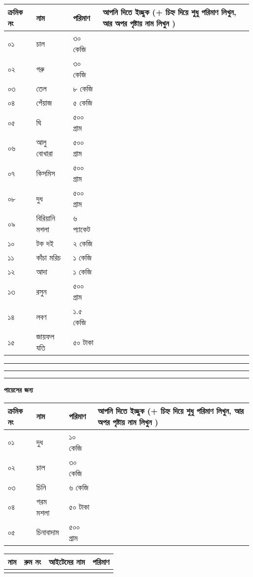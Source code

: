 \documentclass[12pt]{article}
\newcommand{\aline}{\\\hline \arabic{theyflines} &&&\rule{0cm}{0.8cm}}
\begin{document}
\begin{center}
\end{center}
\noindent
\bgroup
\def\arraystretch{2.4}
\begin{tabular}{@{}lll|p{15cm}}
\toprule
ক্রমিক নং &  নাম &  পরিমাণ & আপনি দিতে ইচ্ছুক (+ চিহ্ন দিয়ে শুধু পরিমাণ লিখুন, আর অপর পৃষ্টায় নাম লিখুন )\\
\toprule
০১ & চাল & ৩০ কেজি &\\
\hline
০২ & গরু & ৩০ কেজি &\\
\hline
০৩ & তেল & ৮ কেজি &\\
\hline
০৪ & পেঁয়াজ & ৫ কেজি &\\
\hline
০৫ & ঘি & ৫০০ গ্রাম &\\
\hline
০৬ & আলু বোখারা & ৫০০ গ্রাম &\\
\hline
০৭ & কিসমিস & ৫০০ গ্রাম &\\
\hline
০৮ & দুধ & ৫০০ গ্রাম &\\
\hline
০৯ & বিরিয়ানি মশলা & ৬ প্যাকেট &\\
\hline
১০ & টক দই & ২ কেজি &\\
\hline
১১ & কাঁচা মরিচ & ১ কেজি &\\
\hline
১২ & আদা & ১ কেজি &\\
\hline
১৩ & রসুন & ৫০০ গ্রাম &\\
\hline
১৪ & লবণ & ১.৫ কেজি &\\
\hline
১৫ & জায়ফল যতি & ৫০ টাকা &\\
\bottomrule
\end{tabular}
\hrule
\hrule
\hrule
\vspace{0.5cm}
\textbf{পায়েসের জন্য}\\
\noindent
\begin{tabular}{@{}lll|p{15cm}}
\toprule
ক্রমিক নং &  নাম &  পরিমাণ & আপনি দিতে ইচ্ছুক (+ চিহ্ন দিয়ে শুধু পরিমাণ লিখুন, আর অপর পৃষ্টায় নাম লিখুন )\\
\toprule
০১ & দুধ & ১০ কেজি & \\
\hline
০২ & চাল & ৩০ কেজি & \\
\hline
০৩ & চিনি & ৬ কেজি & \\
\hline
০৪ & গরম মশলা & ৫০ টাকা & \\
\hline
০৫ & চিনাবাদাম & ৫০০ গ্রাম & \\
\bottomrule
\end{tabular}
\egroup
\newpage
\noindent
\begin{tabular}{|p{6cm}|p{3cm}|p{5cm}|p{4cm}|}
\toprule
নাম & রুম নং & আইটেমের নাম & পরিমাণ
\forloop{theyflines}{1}{\value{theyflines} < 31}{\aline}\\
\toprule
\end{tabular}
\end{document}
